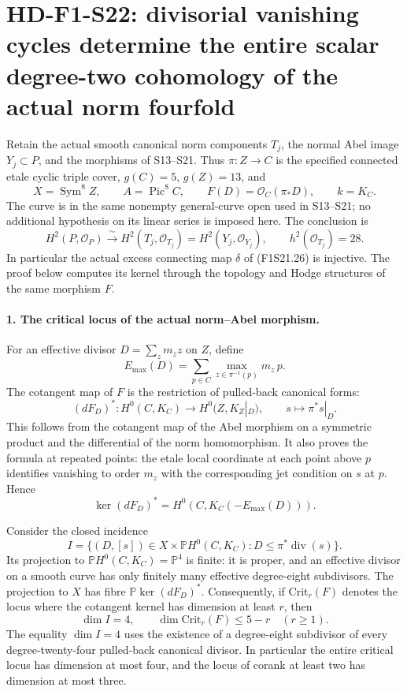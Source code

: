 \section[HD-F1-S22: the degree-two excess map is injective]{HD-F1-S22: divisorial vanishing cycles determine the entire scalar degree-two cohomology of the actual norm fourfold}
\label{sec:f1-norm-fourfold-degree-two-support}

Retain the actual smooth canonical norm components $T_j$, the normal
Abel image $Y_j\subset P$, and the morphisms of S13--S21. Thus
$\pi:Z\to C$ is the specified connected etale cyclic triple cover,
$g(C)=5$, $g(Z)=13$, and
\[
 X=\operatorname{Sym}^8 Z,\qquad A=\operatorname{Pic}^8 C,
 \qquad F(D)=\mathcal O_C(\pi_*D),\qquad k=K_C.
 \tag{F1S22.1}
\]
The curve is in the same nonempty general-curve open used in
S13--S21; no additional hypothesis on its linear series is imposed
here. The conclusion is
\[
 H^2(P,\mathcal O_P)\xrightarrow{\ \sim\ }
 H^2(T_j,\mathcal O_{T_j})
   =H^2(Y_j,\mathcal O_{Y_j}),\qquad h^2(\mathcal O_{T_j})=28.
 \tag{F1S22.2}
\]
In particular the actual excess connecting map $\delta$ of
(F1S21.26) is injective. The proof below computes its kernel through
the topology and Hodge structures of the same morphism $F$.

\paragraph{1. The critical locus of the actual norm--Abel morphism.}
For an effective divisor $D=\sum_z m_z z$ on $Z$, define
\[
 E_{\max}(D)=\sum_{p\in C}\max_{z\in\pi^{-1}(p)}m_z\,p.
\]
The cotangent map of $F$ is the restriction of pulled-back
canonical forms:
\[
 (dF_D)^*:H^0(C,K_C)\longrightarrow H^0(Z,K_Z|_D),
 \qquad s\longmapsto\pi^*s|_D.
 \tag{F1S22.3}
\]
This follows from the cotangent map of the Abel morphism on a
symmetric product and the differential of the norm homomorphism.
It also proves the formula at repeated points: the etale local
coordinate at each point above $p$ identifies vanishing to order
$m_z$ with the corresponding jet condition on $s$ at $p$. Hence
\[
 \ker(dF_D)^*=H^0(C,K_C(-E_{\max}(D))).
 \tag{F1S22.4}
\]

Consider the closed incidence
\[
 I=\{(D,[s])\in X\times\mathbb P H^0(C,K_C):
                           D\le\pi^*\operatorname{div}(s)\}.
 \tag{F1S22.5}
\]
Its projection to $\mathbb P H^0(C,K_C)=\mathbb P^4$ is finite:
it is proper, and an effective divisor on a smooth curve has only
finitely many effective degree-eight subdivisors. The projection
to $X$ has fibre $\mathbb P\ker(dF_D)^*$. Consequently, if
$\mathrm{Crit}_r(F)$ denotes the locus where the cotangent kernel
has dimension at least $r$, then
\[
 \dim I=4,\qquad
 \dim\mathrm{Crit}_r(F)\le5-r\quad(r\ge1).
 \tag{F1S22.6}
\]
The equality $\dim I=4$ uses the existence of a degree-eight
subdivisor of every degree-twenty-four pulled-back canonical
divisor. In particular the entire critical locus has dimension
at most four, and the locus of corank at least two has dimension
at most three.

